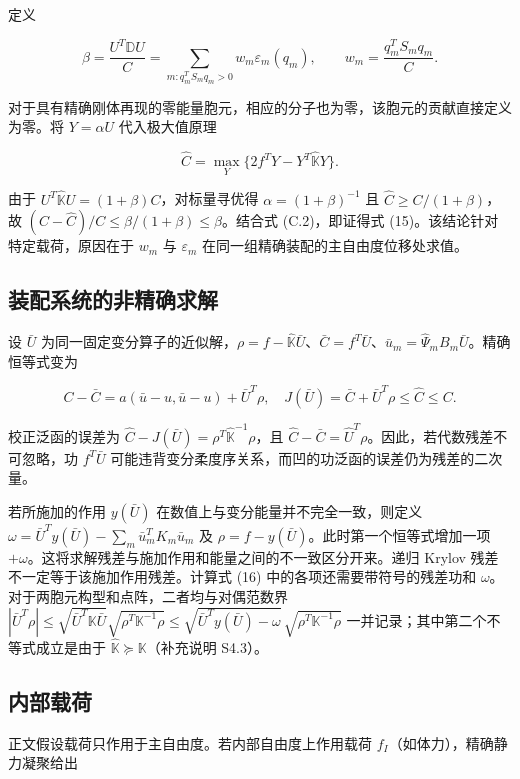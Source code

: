 \documentclass[preprint,12pt,authoryear]{elsarticle}
\begin{document}
定义

\[
\beta=\frac{U^T\mathbb D U}{C}
=\sum_{m:q_m^TS_mq_m>0}w_m\varepsilon_m(q_m),
\qquad w_m=\frac{q_m^TS_mq_m}{C}.
\]

对于具有精确刚体再现的零能量胞元，相应的分子也为零，该胞元的贡献直接定义为零。将 \(Y=\alpha U\) 代入极大值原理

\[
\widehat C=\max_Y\{2f^TY-Y^T\widehat{\mathbb K}Y\}.
\]

由于 \(U^T\widehat{\mathbb K}U=(1+\beta)C\)，对标量寻优得 \(\alpha=(1+\beta)^{-1}\) 且 \(\widehat C\ge C/(1+\beta)\)，故 \((C-\widehat C)/C\le\beta/(1+\beta)\le\beta\)。结合式 (C.2)，即证得式 (15)。该结论针对特定载荷，原因在于 \(w_m\) 与 \(\varepsilon_m\) 在同一组精确装配的主自由度位移处求值。

\subsection{装配系统的非精确求解}

设 \(\bar U\) 为同一固定变分算子的近似解，\(\rho=f-\widehat{\mathbb K}\bar U\)、\(\bar C=f^T\bar U\)、\(\bar u_m=\widehat\Psi_mB_m\bar U\)。精确恒等式变为

\[
\boxed{C-\bar C
=a(\bar u-u,\bar u-u)+\bar U^T\rho,
\quad
J(\bar U)=\bar C+\bar U^T\rho\le\widehat C\le C.}
\]

校正泛函的误差为 \(\widehat C-J(\bar U)=\rho^T\widehat{\mathbb K}^{-1}\rho\)，且 \(\widehat C-\bar C=\widehat U^T\rho\)。因此，若代数残差不可忽略，功 \(f^T\bar U\) 可能违背变分柔度序关系，而凹的功泛函的误差仍为残差的二次量。

若所施加的作用 \(y(\bar U)\) 在数值上与变分能量并不完全一致，则定义
\(\omega=\bar U^Ty(\bar U)-\sum_m\bar u_m^TK_m\bar u_m\)
及 \(\rho=f-y(\bar U)\)。此时第一个恒等式增加一项 \(+\omega\)。这将求解残差与施加作用和能量之间的不一致区分开来。递归 Krylov 残差不一定等于该施加作用残差。计算式 (16) 中的各项还需要带符号的残差功和 \(\omega\)。对于两胞元构型和点阵，二者均与对偶范数界 \(|\bar U^T\rho|\le\sqrt{\bar U^T\mathbb K\bar U}\sqrt{\rho^T\mathbb K^{-1}\rho}\le\sqrt{\bar U^Ty(\bar U)-\omega}\,\sqrt{\rho^T\mathbb K^{-1}\rho}\) 一并记录；其中第二个不等式成立是由于 \(\widehat{\mathbb K}\succeq\mathbb K\)（补充说明 S4.3）。

\subsection{内部载荷}

正文假设载荷只作用于主自由度。若内部自由度上作用载荷 \(f_I\)（如体力），精确静力凝聚给出
\end{document}
